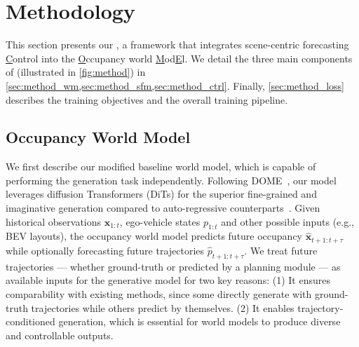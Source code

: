 \section{Methodology}\label{sec:method}





This section presents our \mtd{}, a framework that integrates scene-centric forecasting \underline{C}ontrol into the \underline{O}ccupancy world \underline{M}od\underline{E}l.
We detail the three main components of \mtd{} (illustrated in \cref{fig:method}) in \cref{sec:method_wm,sec:method_sfm,sec:method_ctrl}.
Finally, \cref{sec:method_loss} describes the training objectives and the overall training pipeline.


\subsection{Occupancy World Model}\label{sec:method_wm}
We first describe our modified baseline world model, which is capable of performing the generation task independently. 
Following DOME~\cite{dome}, our model leverages diffusion Transformers (DiTs) for the superior fine-grained and imaginative generation compared to auto-regressive counterparts~\cite{occworld,dome,occ-llm,occllama}. 
Given historical observations $\mathbf{x}_{1:t}$, ego-vehicle states $p_{1:t}$ and other possible inputs (e.g., BEV layouts), the occupancy world model predicts future occupancy $\mathbf{\hat{x}}_{t+1:t+\tau}$  while optionally forecasting future trajectories $\hat{p}_{t+1:t+\tau}$.
We treat future trajectories — whether ground-truth or predicted by a planning module — as available inputs for the generative model for two key reasons:
(1) It ensures comparability with existing methods, since some directly generate with ground-truth trajectories while others predict by themselves.
(2) It enables trajectory-conditioned generation, which is essential for world models to produce diverse and controllable outputs.


